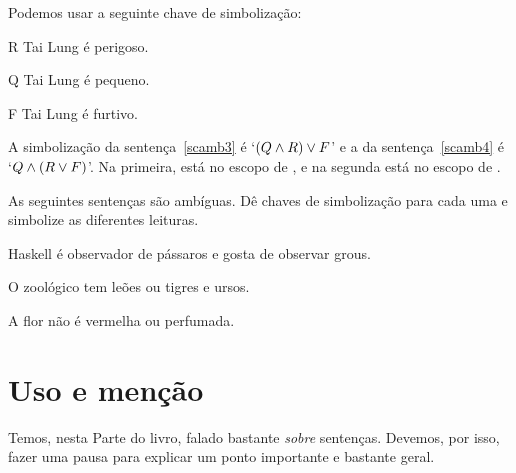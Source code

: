 Podemos usar a seguinte chave de simbolização:
\begin{ekey}
\item[R] Tai Lung é perigoso.
\item[Q] Tai Lung é pequeno.
\item[F] Tai Lung é furtivo.
\end{ekey} 

A simbolização da sentença~\ref{scamb3} é `$(Q \wedge R) \vee F$' e a da sentença~\ref{scamb4} é `$Q \wedge (R \vee F)$'. Na primeira, \eand está no escopo de \eor, e na segunda \eor está no escopo de \eand.

\practiceproblems
\solutions
\problempart As seguintes sentenças são ambíguas. Dê chaves de simbolização para cada uma e simbolize as diferentes leituras.
\begin{earg}
	\item Haskell é observador de pássaros e gosta de observar grous.
	\item O zoológico tem leões ou tigres e ursos.
	\item A flor não é vermelha ou perfumada.
\end{earg} 

\chapter{Uso e menção}\label{s:UseMention}
Temos, nesta Parte do livro, falado bastante \emph{sobre} sentenças.
Devemos, por isso, fazer uma pausa para explicar um ponto importante e bastante geral.

